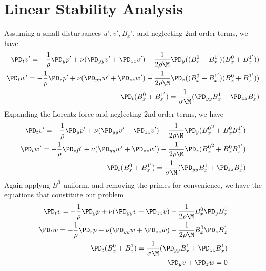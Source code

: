 \documentclass[11pt]{article}
\begin{document}
\section{Linear Stability Analysis}
Assuming a small disturbances $u',v',B_x'$, and neglecting 2nd order terms, we have
\begin{equation}\begin{aligned}
\PD_t v' = -\frac{1}{\rho}\PD_y p' + \nu (\PD_{yy} v'+\PD_{zz} v') - \frac{1}{2\rho \M} \PD_y ((B_x^{0}+B_x^{1'}) (B_x^{0}+B_x^{1'})) \\
\PD_t w' = -\frac{1}{\rho}\PD_z p' + \nu (\PD_{yy} w'+\PD_{zz} w') - \frac{1}{2\rho \M} \PD_z ((B_x^{0}+B_x^{1'}) (B_x^{0}+B_x^{1'})) \\
\PD_t (B_x^{0}+B_x^{1'}) = \frac{1}{\sigma \M} (\PD_{yy} B_x^1+\PD_{zz} B_x^1) \\
\end{aligned} \end{equation}
Expanding the Lorentz force and neglecting 2nd order terms, we have
\begin{equation}\begin{aligned}
\PD_t v' = -\frac{1}{\rho} \PD_y p' + \nu (\PD_{yy} v'+\PD_{zz} v') - \frac{1}{2\rho \M} \PD_y ({B_x^{0}}^2+B_x^{0} B_x^{1'}) \\
\PD_t w' = -\frac{1}{\rho} \PD_z p' + \nu (\PD_{yy} w'+\PD_{zz} w') - \frac{1}{2\rho \M} \PD_z ({B_x^{0}}^2+B_x^{0} B_x^{1'}) \\
\PD_t (B_x^{0}+B_x^{1'}) = \frac{1}{\sigma \M} (\PD_{yy} B_x^1+\PD_{zz} B_x^1) \\
\end{aligned} \end{equation}
Again applyng $B^0$ uniform, and removing the primes for convenience, we have the equations that constitute our problem
\begin{equation}\begin{aligned}
\PD_t v = -\frac{1}{\rho} \PD_y p + \nu (\PD_{yy} v+\PD_{zz} v) - \frac{1}{2\rho \M} B_x^0 \PD_y B_x^1 \\
\PD_t w = -\frac{1}{\rho} \PD_z p + \nu (\PD_{yy} w+\PD_{zz} w) - \frac{1}{2\rho \M} B_x^0 \PD_z B_x^1 \\
\PD_t (B_x^0+B_x^1) = \frac{1}{\sigma \M} (\PD_{yy} B_x^1+\PD_{zz} B_x^1) \\
\PD_y v + \PD_z w = 0 \\
\end{aligned} \end{equation}
\end{document}
